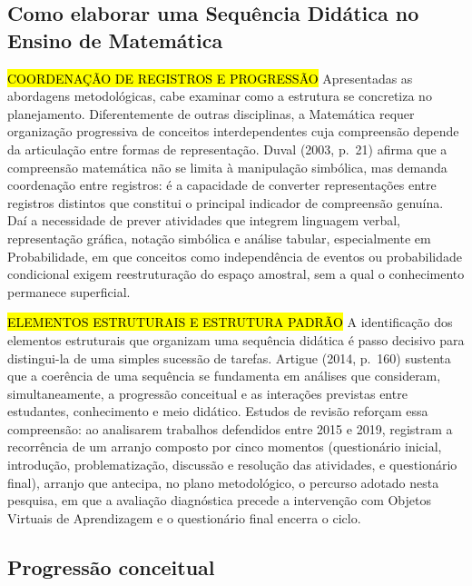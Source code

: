 {\subsection{Como elaborar uma Sequência Didática no Ensino de Matemática}

\hl {COORDENAÇÃO DE REGISTROS E PROGRESSÃO} Apresentadas as abordagens metodológicas, cabe examinar como a estrutura se concretiza no planejamento. Diferentemente de outras disciplinas, a Matemática requer organização progressiva de conceitos interdependentes cuja compreensão depende da articulação entre formas de representação. Duval (2003, p.~21) afirma que a compreensão matemática não se limita à manipulação simbólica, mas demanda coordenação entre registros: é a capacidade de converter representações entre registros distintos que constitui o principal indicador de compreensão genuína. Daí a necessidade de prever atividades que integrem linguagem verbal, representação gráfica, notação simbólica e análise tabular, especialmente em Probabilidade, em que conceitos como independência de eventos ou probabilidade condicional exigem reestruturação do espaço amostral, sem a qual o conhecimento permanece superficial.

\hl{ELEMENTOS ESTRUTURAIS E ESTRUTURA PADRÃO} A identificação dos elementos estruturais que organizam uma sequência didática é passo decisivo para distingui-la de uma simples sucessão de tarefas. Artigue (2014, p.~160) sustenta que a coerência de uma sequência se fundamenta em análises que consideram, simultaneamente, a progressão conceitual e as interações previstas entre estudantes, conhecimento e meio didático. Estudos de revisão reforçam essa compreensão: ao analisarem trabalhos defendidos entre 2015 e 2019,  registram a recorrência de um arranjo composto por cinco momentos (questionário inicial, introdução, problematização, discussão e resolução das atividades, e questionário final), arranjo que antecipa, no plano metodológico, o percurso adotado nesta pesquisa, em que a avaliação diagnóstica precede a intervenção com Objetos Virtuais de Aprendizagem e o questionário final encerra o ciclo.

\subsection{Progressão conceitual}

}
